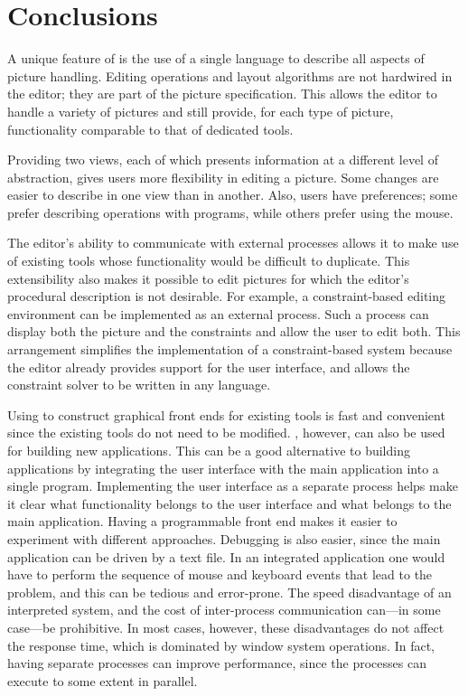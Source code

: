 \chapter{Conclusions}
\label{secconc}
A unique feature of {\LEFTY} is the use of a single language to describe all
aspects of picture handling. Editing operations and layout algorithms are not
hardwired in the editor; they are part of the picture specification. This
allows the editor to handle a variety of pictures and still provide, for each
type of picture, functionality comparable to that of dedicated tools.

Providing two views, each of which presents information at a different level of
abstraction, gives users more flexibility in editing a picture. Some changes
are easier to describe in one view than in another. Also, users have
preferences; some prefer describing operations with programs, while others
prefer using the mouse.

The editor's ability to communicate with external processes allows it to make
use of existing tools whose functionality would be difficult to duplicate. This
extensibility also makes it possible to edit pictures for which the editor's
procedural description is not desirable. For example, a constraint-based
editing environment can be implemented as an external process. Such a process
can display both the picture and the constraints and allow the user to edit
both. This arrangement simplifies the implementation of a constraint-based
system because the editor already provides support for the user interface, and
allows the constraint solver to be written in any language.

Using {\LEFTY} to construct graphical front ends for existing tools is fast and
convenient since the existing tools do not need to be modified. {\LEFTY},
however, can also be used for building new applications. This can be a good
alternative to building applications by integrating the user interface with the
main application into a single program.  Implementing the user interface as a
separate process helps make it clear what functionality belongs to the user
interface and what belongs to the main application.  Having a programmable
front end makes it easier to experiment with different approaches. Debugging is
also easier, since the main application can be driven by a text file. In an
integrated application one would have to perform the sequence of mouse and
keyboard events that lead to the problem, and this can be tedious and
error-prone.  The speed disadvantage of an interpreted system, and the cost of
inter-process communication can---in some case---be prohibitive. In most cases,
however, these disadvantages do not affect the response time, which is
dominated by window system operations. In fact, having separate processes can
improve performance, since the processes can execute to some extent in
parallel.
